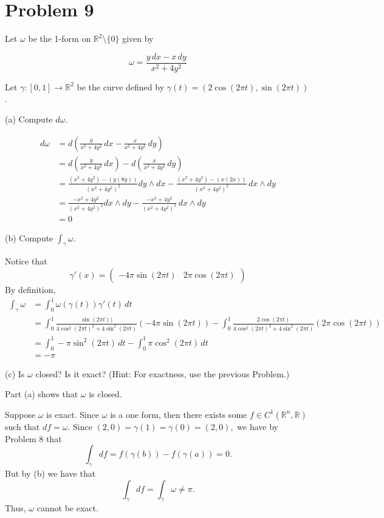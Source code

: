 \documentclass[11pt]{article}
\newcommand{\bbR}{\mathbb{R}}
\begin{document}
\newpage

\section*{Problem 9}

Let $\omega$ be the 1-form on $\mathbb{R}^2 \setminus \{0\}$ given by

\[
\omega = \frac{y \, dx - x \, dy}{x^2 + 4y^2}
\]

Let $\gamma : [0, 1] \to \mathbb{R}^2$ be the curve defined by $\gamma(t) = (2 \cos(2\pi t), \sin(2\pi t))$.

(a) Compute $d\omega$.
\begin{solution}
    \begin{align*}
        d\omega&= d\left(\frac{y}{x^2 + 4y^2}\,dx - \frac{x}{x^2 + 4y^2}\,dy\right)\\
        &= d\left(\frac{y}{x^2 + 4y^2}\, dx\right) - d\left(\frac{x}{x^2 + 4y^2}\,dy\right)\\
        &= \frac{(x^2 + 4y^2) - (y(8y))}{(x^2 + 4y^2)^2}dy \wedge dx - \frac{(x^2 + 4y^2) - (x(2x))}{(x^2 + 4y^2)^2}\,dx\wedge dy\\
        &= \frac{-x^2 + 4y^2}{(x^2 + 4y^2)^2}dx \wedge dy - \frac{-x^2 + 4y^2}{(x^2 + 4y^2)^2}\,dx\wedge dy\\
        &= 0
    \end{align*}
\end{solution}

(b) Compute $\int_{\gamma} \omega$.
\begin{solution}
Notice that 
\[\gamma'(x) = \begin{pmatrix}
    -4\pi\sin (2\pi t) & 2\pi \cos (2\pi t) 
\end{pmatrix}\]
    By definition,
\begin{align*}
    \int_\gamma \omega &= \int_0^1\omega(\gamma(t))\gamma'(t)\,dt\\
    &= \int_0^1 \frac{\sin(2\pi t))}{4 \cos^2(2\pi t)^2 + 4\sin^2(2\pi t)}(-4\pi\sin (2\pi t))- \int_0^1\frac{2 \cos(2\pi t)}{4 \cos^2(2\pi t)^2 + 4\sin^2(2\pi t)}(2\pi \cos (2\pi t))\\
    &= \int_0^1-\pi \sin^2(2\pi t)\,dt  - \int_0^1 \pi \cos^2(2\pi t)\,dt\\
    &= -\pi
\end{align*}
\end{solution}

(c) Is $\omega$ closed? Is it exact? (Hint: For exactness, use the previous Problem.)
\begin{solution}
    Part (a) shows that $\omega$ is closed. 

    Suppose $\omega$ is exact. Since $\omega$ is a one form, then there exists some $f\in C^1(\bbR^n, \bbR)$ such that $df = \omega.$ Since $(2, 0)=\gamma(1) = \gamma(0) = (2,0),$ we have by Problem 8 that 
    \[\int_\gamma df = f(\gamma(b)) - f(\gamma(a)) = 0.\] But by (b) we have that
    \[\int_\gamma df = \int_\gamma \omega \neq \pi.\] Thus, $\omega$ cannot be exact.
\end{solution}
\end{document}
